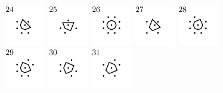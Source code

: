 \documentclass[text.tex]{subfiles}
\begin{document}
\begin{figure}[h!]
\includegraphics[width=0.16\textwidth]{img/results/circle8_concat/circle8_100000_(1_0alpha_1)_024.pdf}
\includegraphics[width=0.16\textwidth]{img/results/circle8_concat/circle8_100000_(1_0alpha_1)_025.pdf}
\includegraphics[width=0.16\textwidth]{img/results/circle8_concat/circle8_100000_(1_0alpha_1)_026.pdf}
\includegraphics[width=0.16\textwidth]{img/results/circle8_concat/circle8_100000_(1_0alpha_1)_027.pdf}
\includegraphics[width=0.16\textwidth]{img/results/circle8_concat/circle8_100000_(1_0alpha_1)_028.pdf}
\includegraphics[width=0.16\textwidth]{img/results/circle8_concat/circle8_100000_(1_0alpha_1)_029.pdf}
\includegraphics[width=0.16\textwidth]{img/results/circle8_concat/circle8_100000_(1_0alpha_1)_030.pdf}
\includegraphics[width=0.16\textwidth]{img/results/circle8_concat/circle8_100000_(1_0alpha_1)_031.pdf}

\end{figure}
\end{document}
